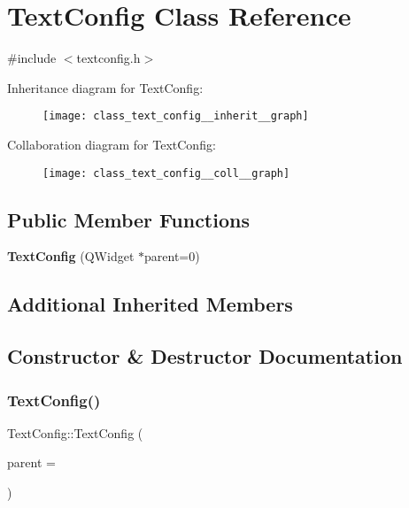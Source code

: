 \section{Text\+Config Class Reference}
\label{class_text_config}


{\ttfamily \#include $<$textconfig.\+h$>$}



Inheritance diagram for Text\+Config\+:\nopagebreak
\begin{figure}[H]
\begin{center}
\leavevmode
\texttt{[image: class\_text\_config\_\_inherit\_\_graph]}
\end{center}
\end{figure}


Collaboration diagram for Text\+Config\+:\nopagebreak
\begin{figure}[H]
\begin{center}
\leavevmode
\texttt{[image: class\_text\_config\_\_coll\_\_graph]}
\end{center}
\end{figure}
\subsection*{Public Member Functions}
\begin{DoxyCompactItemize}
\item 
\textbf{ Text\+Config} (Q\+Widget $\ast$parent=0)
\end{DoxyCompactItemize}
\subsection*{Additional Inherited Members}


\subsection{Constructor \& Destructor Documentation}
\mbox{\label{class_text_config_a596b03b4b1bcd9dc8037d7463f37513e}} 
\subsubsection{Text\+Config()}
{\footnotesize\ttfamily Text\+Config\+::\+Text\+Config (\begin{DoxyParamCaption}\item[{Q\+Widget $\ast$}]{parent = {} }\end{DoxyParamCaption})}

